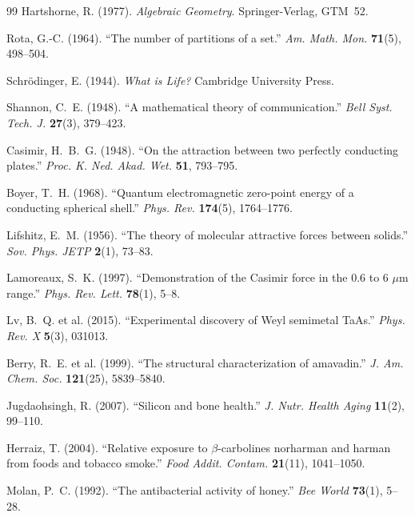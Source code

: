 \begin{thebibliography}{99}
Hartshorne, R. (1977).
\textit{Algebraic Geometry}. Springer-Verlag, GTM~52.

Rota, G.-C. (1964).
``The number of partitions of a set.''
\textit{Am. Math. Mon.} \textbf{71}(5), 498--504.

Schr\"odinger, E. (1944).
\textit{What is Life?} Cambridge University Press.

Shannon, C.~E. (1948).
``A mathematical theory of communication.''
\textit{Bell Syst. Tech. J.} \textbf{27}(3), 379--423.


Casimir, H.~B.~G. (1948).
``On the attraction between two perfectly conducting plates.''
\textit{Proc. K. Ned. Akad. Wet.} \textbf{51}, 793--795.

Boyer, T.~H. (1968).
``Quantum electromagnetic zero-point energy of a conducting spherical shell.''
\textit{Phys. Rev.} \textbf{174}(5), 1764--1776.

Lifshitz, E.~M. (1956).
``The theory of molecular attractive forces between solids.''
\textit{Sov. Phys. JETP} \textbf{2}(1), 73--83.

Lamoreaux, S.~K. (1997).
``Demonstration of the Casimir force in the 0.6 to 6 $\mu$m range.''
\textit{Phys. Rev. Lett.} \textbf{78}(1), 5--8.

Lv, B.~Q. et al. (2015).
``Experimental discovery of Weyl semimetal TaAs.''
\textit{Phys. Rev. X} \textbf{5}(3), 031013.


Berry, R.~E. et al. (1999).
``The structural characterization of amavadin.''
\textit{J. Am. Chem. Soc.} \textbf{121}(25), 5839--5840.

Jugdaohsingh, R. (2007).
``Silicon and bone health.''
\textit{J. Nutr. Health Aging} \textbf{11}(2), 99--110.

Herraiz, T. (2004).
``Relative exposure to $\beta$-carbolines norharman and harman from foods and tobacco smoke.''
\textit{Food Addit. Contam.} \textbf{21}(11), 1041--1050.

Molan, P.~C. (1992).
``The antibacterial activity of honey.''
\textit{Bee World} \textbf{73}(1), 5--28.


\end{thebibliography}
